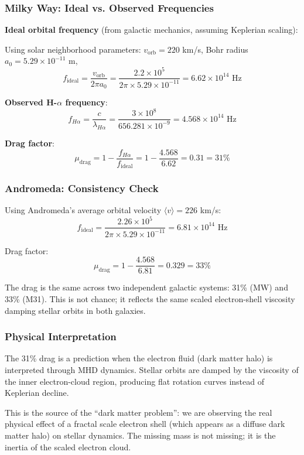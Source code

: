 \documentclass[11pt,a4paper]{article}
\begin{document}
\subsubsection{Milky Way: Ideal vs. Observed Frequencies}

\noindent\textbf{Ideal orbital frequency} (from galactic mechanics, assuming Keplerian scaling):

Using solar neighborhood parameters: $v_{\text{orb}} = 220$ km/s, Bohr radius $a_0 = 5.29 \times 10^{-11}$ m,
\[
f_{\text{ideal}} = \frac{v_{\text{orb}}}{2\pi a_0} = \frac{2.2 \times 10^5}{2\pi \times 5.29 \times 10^{-11}} = 6.62 \times 10^{14} \text{ Hz}
\]

\noindent\textbf{Observed H-$\alpha$ frequency}:
\[
f_{H\alpha} = \frac{c}{\lambda_{H\alpha}} = \frac{3 \times 10^8}{656.281 \times 10^{-9}} = 4.568 \times 10^{14} \text{ Hz}
\]

\noindent\textbf{Drag factor}:
\[
\mu_{\text{drag}} = 1 - \frac{f_{H\alpha}}{f_{\text{ideal}}} = 1 - \frac{4.568}{6.62} = 0.31 = \boxed{31\%}
\]

\subsubsection{Andromeda: Consistency Check}

Using Andromeda's average orbital velocity $\langle v \rangle = 226$ km/s:
\[
f_{\text{ideal}} = \frac{2.26 \times 10^5}{2\pi \times 5.29 \times 10^{-11}} = 6.81 \times 10^{14} \text{ Hz}
\]

\noindent Drag factor:
\[
\mu_{\text{drag}} = 1 - \frac{4.568}{6.81} = 0.329 = \boxed{33\%}
\]

The drag is the same across two independent galactic systems: 31\% (MW) and 33\% (M31). This is not chance; it reflects the same scaled electron-shell viscosity damping stellar orbits in both galaxies.

\subsubsection{Physical Interpretation}

The 31\% drag is a prediction when the electron fluid (dark matter halo) is interpreted through MHD dynamics. Stellar orbits are damped by the viscosity of the inner electron-cloud region, producing flat rotation curves instead of Keplerian decline.

This is the source of the ``dark matter problem'': we are observing the real physical effect of a fractal scale electron shell (which appears as a diffuse dark matter halo) on stellar dynamics. The missing mass is not missing; it is the inertia of the scaled electron cloud.
\end{document}
